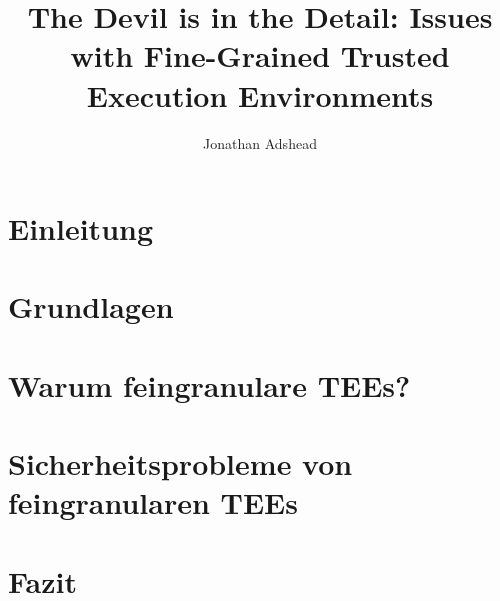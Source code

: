 \documentclass[sigconf]{acmart}
\title{The Devil is in the Detail: Issues with Fine-Grained Trusted Execution Environments}
\author{Jonathan Adshead}
\affiliation{
    \institution{Friedricht-Alexander-Universität Erlangen-Nürnberg}
    \country{}}
\begin{document}
\maketitle  %







\section{Einleitung}


\section{Grundlagen}


\section{Warum feingranulare TEEs?}


\section{Sicherheitsprobleme von feingranularen TEEs}


\section{Fazit}


\newpage


\end{document}
